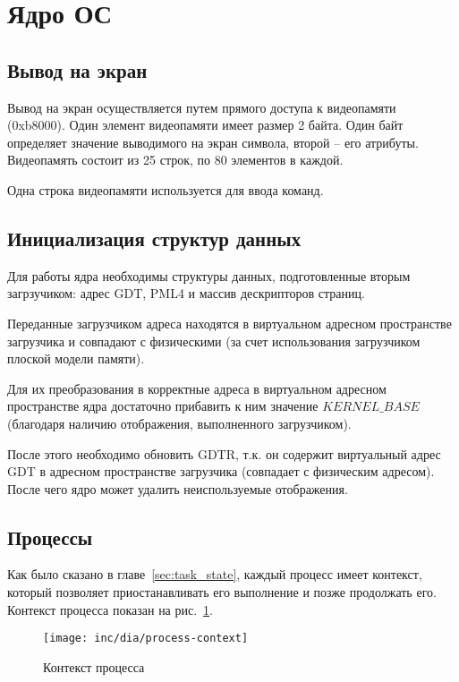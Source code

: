 \section{Ядро ОС}

\subsection{Вывод на экран}
Вывод на экран осуществляется путем прямого доступа к видеопамяти (0xb8000). Один элемент
видеопамяти имеет размер 2 байта. Один байт определяет значение выводимого на экран символа,
второй -- его атрибуты. Видеопамять состоит из 25 строк, по 80 элементов в каждой.

Одна строка видеопамяти используется для ввода команд.

\subsection{Инициализация структур данных}
Для работы ядра необходимы структуры данных, подготовленные вторым загрзучиком:
адрес GDT, PML4 и массив дескрипторов страниц.

Переданные загрузчиком адреса находятся в виртуальном адресном пространстве загрузчика
и совпадают с физическими (за счет использования загрузчиком плоской модели памяти).

Для их преобразования в корректные адреса в виртуальном адресном пространстве ядра
достаточно прибавить к ним значение $KERNEL\_BASE$ (благодаря наличию отображения,
выполненного загрузчиком).

После этого необходимо обновить GDTR, т.к. он содержит виртуальный адрес GDT в адресном
пространстве загрузчика (совпадает с физическим адресом). После чего ядро может удалить
неиспользуемые отображения.

\subsection{Процессы}
Как было сказано в главе~\ref{sec:task_state}, каждый процесс имеет контекст, который позволяет
приостанавливать его выполнение и позже продолжать его. Контекст процесса показан
на рис.~\ref{fig:process-context}.

\begin{figure}[ht!]
  \centering
  \texttt{[image: inc/dia/process-context]}
  \caption{Контекст процесса}
  \label{fig:process-context}
\end{figure}

